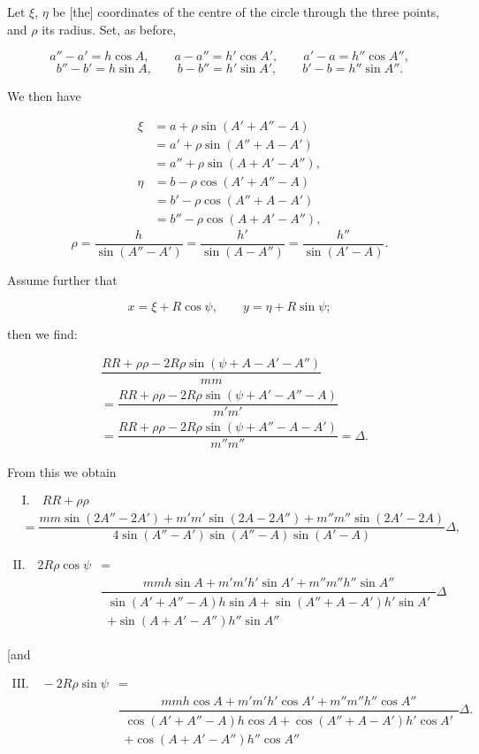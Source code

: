 

Let $\xi$, $\eta$ be [the] coordinates of the centre of the circle through the three points, and $\rho$ its radius. Set, as before,

\[
a'' - a' = h\cos A, \qquad a - a'' = h'\cos A', \qquad a' - a = h''\cos A'',
\]
\[
b'' - b' = h\sin A, \qquad b - b'' = h'\sin A', \qquad b' - b = h''\sin A''.
\]

We then have

\[
\begin{aligned}
\xi &= a + \rho\sin(A'+A''-A)\\ &= a' + \rho\sin(A''+A-A')\\ &= a'' + \rho\sin(A+A'-A''),
\end{aligned}
\]
\[
\begin{aligned}
\eta &= b - \rho\cos(A'+A''-A)\\ &= b' - \rho\cos(A''+A-A')\\ &= b'' - \rho\cos(A+A'-A''),
\end{aligned}
\]
\[
\rho = \dfrac{h}{\sin(A''-A')} = \dfrac{h'}{\sin(A-A'')} = \dfrac{h''}{\sin(A'-A)}.
\]

\begin{center}\end{center}

Assume further that

\[
x = \xi + R\cos\psi, \qquad y = \eta + R\sin\psi;
\]

then we find:

\[
\begin{aligned}
&\dfrac{RR+\rho\rho-2R\rho\sin(\psi+A-A'-A'')}{mm}\\ &= \dfrac{RR+\rho\rho-2R\rho\sin(\psi+A'-A''-A)}{m'm'}\\ &= \dfrac{RR+\rho\rho-2R\rho\sin(\psi+A''-A-A')}{m''m''} = \Delta.
\end{aligned}
\]

From this we obtain

\[
\begin{aligned}&\mathrm{I.}\quad RR+\rho\rho\\ &=\dfrac{mm\sin(2A''-2A')+m'm'\sin(2A-2A'')+m''m''\sin(2A'-2A)}{4\sin(A''-A')\sin(A''-A)\sin(A'-A)}\Delta,\end{aligned}
\]

\[
\begin{aligned}\mathrm{II.}\quad 2R\rho\cos\psi&=\\ &\dfrac{mmh\sin A+m'm'h'\sin A'+m''m''h''\sin A''}{\substack{\sin(A'+A''-A)h\sin A+\sin(A''+A-A')h'\sin A'\\+\sin(A+A'-A'')h''\sin A''}}\Delta\end{aligned}
\]

[and

\[
\begin{aligned}\mathrm{III.}\quad -2R\rho\sin\psi&=\\ &\dfrac{mmh\cos A+m'm'h'\cos A'+m''m''h''\cos A''}{\substack{\cos(A'+A''-A)h\cos A+\cos(A''+A-A')h'\cos A'\\+\cos(A+A'-A'')h''\cos A''}}\Delta.\end{aligned}
\]
